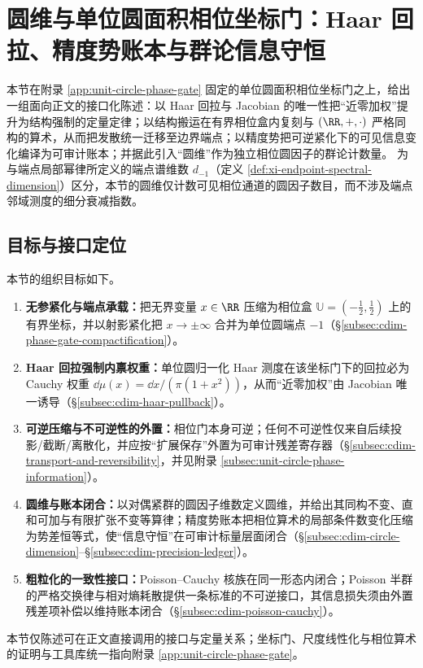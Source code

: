 \section{圆维与单位圆面积相位坐标门：Haar 回拉、精度势账本与群论信息守恒}\label{sec:circle-dimension-phase-gate}

\providecommand{\cdim}{\operatorname{cdim}}
\providecommand{\pcdim}{\operatorname{pcdim}}

本节在附录 \ref{app:unit-circle-phase-gate} 固定的单位圆面积相位坐标门之上，给出一组面向正文的接口化陈述：以 Haar 回拉与 Jacobian 的唯一性把“近零加权”提升为结构强制的定量定律；以结构搬运在有界相位盒内复刻与 \((\RR,+,\cdot)\) 严格同构的算术，从而把发散统一迁移至边界端点；以精度势把可逆紧化下的可见信息变化编译为可审计账本；并据此引入“圆维”作为独立相位圆因子的群论计数量。
为与端点局部幂律所定义的端点谱维数 \(d_{-1}\)（定义 \ref{def:xi-endpoint-spectral-dimension}）区分，本节的圆维仅计数可见相位通道的圆因子数目，而不涉及端点邻域测度的细分衰减指数。

\subsection{目标与接口定位}\label{subsec:cdim-goal-interface}
本节的组织目标如下。
\begin{enumerate}
  \item \textbf{无参紧化与端点承载：}把无界变量 \(x\in\RR\) 压缩为相位盒 \(\mathbb{U}=(-\tfrac12,\tfrac12)\) 上的有界坐标，并以射影紧化把 \(x\to\pm\infty\) 合并为单位圆端点 \(-1\)（\S\ref{subsec:cdim-phase-gate-compactification}）。
  \item \textbf{Haar 回拉强制内禀权重：}单位圆归一化 Haar 测度在该坐标门下的回拉必为 Cauchy 权重 \(\dd\mu(x)=\dd x/(\pi(1+x^2))\)，从而“近零加权”由 Jacobian 唯一诱导（\S\ref{subsec:cdim-haar-pullback}）。
  \item \textbf{可逆压缩与不可逆性的外置：}相位门本身可逆；任何不可逆性仅来自后续投影/截断/离散化，并应按“扩展保存”外置为可审计残差寄存器（\S\ref{subsec:cdim-transport-and-reversibility}，并见附录 \ref{subsec:unit-circle-phase-information}）。
  \item \textbf{圆维与账本闭合：}以对偶紧群的圆因子维数定义圆维，并给出其同构不变、直和可加与有限扩张不变等算律；精度势账本把相位算术的局部条件数变化压缩为势差恒等式，使“信息守恒”在可审计标量层面闭合（\S\ref{subsec:cdim-circle-dimension}--\S\ref{subsec:cdim-precision-ledger}）。
  \item \textbf{粗粒化的一致性接口：}Poisson--Cauchy 核族在同一形态内闭合；Poisson 半群的严格交换律与相对熵耗散提供一条标准的不可逆接口，其信息损失须由外置残差项补偿以维持账本闭合（\S\ref{subsec:cdim-poisson-cauchy}）。
\end{enumerate}
本节仅陈述可在正文直接调用的接口与定量关系；坐标门、尺度线性化与相位算术的证明与工具库统一指向附录 \ref{app:unit-circle-phase-gate}。

